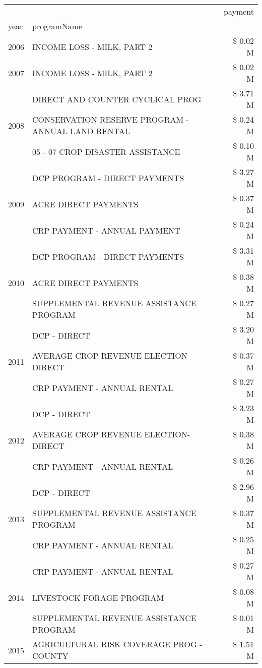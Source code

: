 \begin{tabular}{llr}
\toprule
 &  & payment \\
year & programName &  \\
\midrule
2006 & INCOME LOSS - MILK, PART 2 & \$ 0.02 M \\
\cline{1-3}
2007 & INCOME LOSS - MILK, PART 2 & \$ 0.02 M \\
\cline{1-3}
\multirow[t]{3}{*}{2008} & DIRECT AND COUNTER CYCLICAL PROG & \$ 3.71 M \\
 & CONSERVATION RESERVE PROGRAM - ANNUAL LAND RENTAL & \$ 0.24 M \\
 & 05 - 07 CROP DISASTER ASSISTANCE & \$ 0.10 M \\
\cline{1-3}
\multirow[t]{3}{*}{2009} & DCP PROGRAM - DIRECT PAYMENTS & \$ 3.27 M \\
 & ACRE DIRECT PAYMENTS & \$ 0.37 M \\
 & CRP PAYMENT - ANNUAL PAYMENT & \$ 0.24 M \\
\cline{1-3}
\multirow[t]{3}{*}{2010} & DCP PROGRAM - DIRECT PAYMENTS & \$ 3.31 M \\
 & ACRE DIRECT PAYMENTS & \$ 0.38 M \\
 & SUPPLEMENTAL REVENUE ASSISTANCE PROGRAM & \$ 0.27 M \\
\cline{1-3}
\multirow[t]{3}{*}{2011} & DCP - DIRECT & \$ 3.20 M \\
 & AVERAGE CROP REVENUE ELECTION-DIRECT & \$ 0.37 M \\
 & CRP PAYMENT - ANNUAL RENTAL & \$ 0.27 M \\
\cline{1-3}
\multirow[t]{3}{*}{2012} & DCP - DIRECT & \$ 3.23 M \\
 & AVERAGE CROP REVENUE ELECTION-DIRECT & \$ 0.38 M \\
 & CRP PAYMENT - ANNUAL RENTAL & \$ 0.26 M \\
\cline{1-3}
\multirow[t]{3}{*}{2013} & DCP - DIRECT & \$ 2.96 M \\
 & SUPPLEMENTAL REVENUE ASSISTANCE PROGRAM & \$ 0.37 M \\
 & CRP PAYMENT - ANNUAL RENTAL & \$ 0.25 M \\
\cline{1-3}
\multirow[t]{3}{*}{2014} & CRP PAYMENT - ANNUAL RENTAL & \$ 0.27 M \\
 & LIVESTOCK FORAGE PROGRAM & \$ 0.08 M \\
 & SUPPLEMENTAL REVENUE ASSISTANCE PROGRAM & \$ 0.01 M \\
\cline{1-3}
\multirow[t]{3}{*}{2015} & AGRICULTURAL RISK COVERAGE PROG - COUNTY & \$ 1.51 M \\

\end{tabular}
